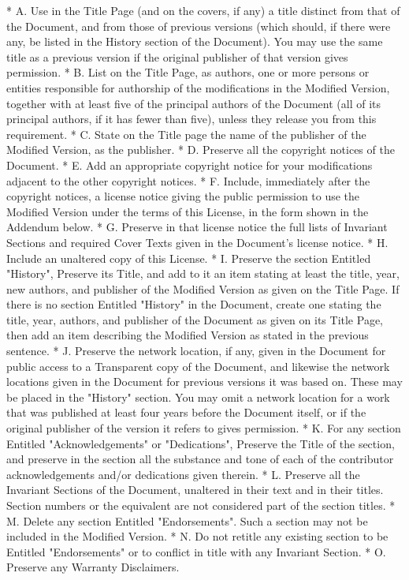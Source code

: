 {\begin{multicols}{4}
    * A. Use in the Title Page (and on the covers, if any) a title distinct from that of the Document, and from those of previous versions (which should, if there were any, be listed in the History section of the Document). You may use the same title as a previous version if the original publisher of that version gives permission.
    * B. List on the Title Page, as authors, one or more persons or entities responsible for authorship of the modifications in the Modified Version, together with at least five of the principal authors of the Document (all of its principal authors, if it has fewer than five), unless they release you from this requirement.
    * C. State on the Title page the name of the publisher of the Modified Version, as the publisher.
    * D. Preserve all the copyright notices of the Document.
    * E. Add an appropriate copyright notice for your modifications adjacent to the other copyright notices.
    * F. Include, immediately after the copyright notices, a license notice giving the public permission to use the Modified Version under the terms of this License, in the form shown in the Addendum below.
    * G. Preserve in that license notice the full lists of Invariant Sections and required Cover Texts given in the Document's license notice.
    * H. Include an unaltered copy of this License.
    * I. Preserve the section Entitled "History", Preserve its Title, and add to it an item stating at least the title, year, new authors, and publisher of the Modified Version as given on the Title Page. If there is no section Entitled "History" in the Document, create one stating the title, year, authors, and publisher of the Document as given on its Title Page, then add an item describing the Modified Version as stated in the previous sentence.
    * J. Preserve the network location, if any, given in the Document for public access to a Transparent copy of the Document, and likewise the network locations given in the Document for previous versions it was based on. These may be placed in the "History" section. You may omit a network location for a work that was published at least four years before the Document itself, or if the original publisher of the version it refers to gives permission.
    * K. For any section Entitled "Acknowledgements" or "Dedications", Preserve the Title of the section, and preserve in the section all the substance and tone of each of the contributor acknowledgements and/or dedications given therein.
    * L. Preserve all the Invariant Sections of the Document, unaltered in their text and in their titles. Section numbers or the equivalent are not considered part of the section titles.
    * M. Delete any section Entitled "Endorsements". Such a section may not be included in the Modified Version.
    * N. Do not retitle any existing section to be Entitled "Endorsements" or to conflict in title with any Invariant Section.
    * O. Preserve any Warranty Disclaimers.


\end{multicols}}
